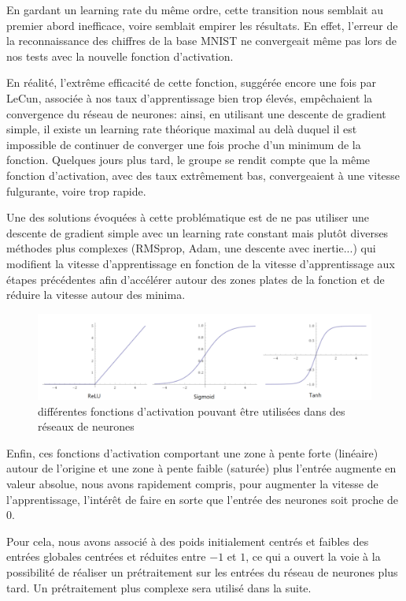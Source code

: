 \documentclass[
    10pt,
    a4paper,
    oneside,
    headinclude,footinclude,
    BCOR=5mm,
    captions=tableabove
]{scrartcl}
\begin{document}
En gardant un learning rate du même ordre, cette transition nous semblait au premier abord inefficace, voire semblait empirer les résultats. En effet, l'erreur de la reconnaissance des chiffres de la base MNIST ne convergeait même pas lors de nos tests avec la nouvelle fonction d'activation. 

En réalité, l'extrême efficacité de cette fonction, suggérée encore une fois par LeCun, associée à nos taux d'apprentissage bien trop élevés, empêchaient la convergence du réseau de neurones: ainsi, en utilisant une descente de gradient simple, il existe un learning rate théorique maximal au delà duquel il est impossible de continuer de converger une fois proche d'un minimum de la fonction. 
Quelques jours plus tard, le groupe se rendit compte que la même fonction d'activation, avec des taux extrêmement bas, convergeaient à une vitesse fulgurante, voire trop rapide. %

Une des solutions évoquées à cette problématique est de ne pas utiliser une descente de gradient simple avec un learning rate constant mais plutôt diverses méthodes plus complexes (RMSprop, Adam, une descente avec inertie...) qui modifient la vitesse d'apprentissage en fonction de la vitesse d'apprentissage aux étapes précédentes afin d'accélérer autour des zones plates de la fonction et de réduire la vitesse autour des minima.

\begin{figure}[h!]
\includegraphics[width=\linewidth]{activations.PNG}
\centering
\caption{différentes fonctions d'activation pouvant être utilisées dans des réseaux de neurones }
\label{fig:activations.PNG}
\end{figure}

Enfin, ces fonctions d'activation comportant une zone à pente forte (linéaire) autour de l'origine et une zone à pente faible (saturée) plus l'entrée augmente en valeur absolue, nous avons rapidement compris, pour augmenter la vitesse de l'apprentissage, l'intérêt de faire en sorte que l'entrée des neurones soit proche de $0$. 

Pour cela, nous avons associé à des poids initialement centrés et faibles des entrées globales centrées et réduites entre $-1$ et $1$, ce qui a ouvert la voie à la possibilité de réaliser un prétraitement sur les entrées du réseau de neurones plus tard. Un prétraitement plus complexe sera utilisé dans la suite. 
\end{document}
